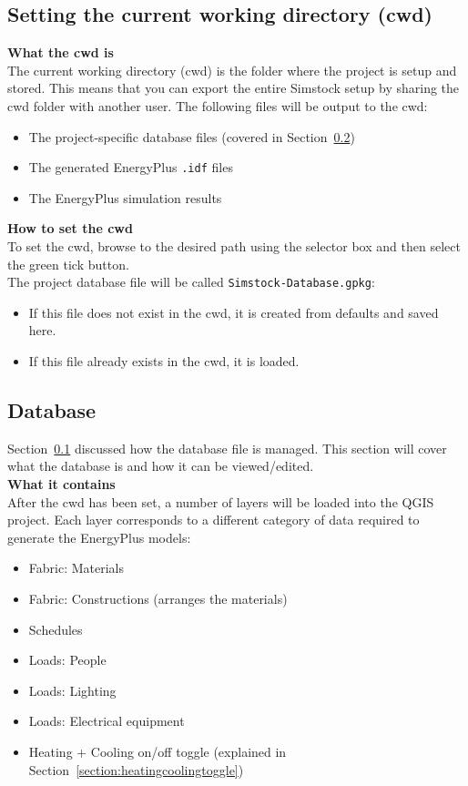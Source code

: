 \documentclass{article}
\begin{document}
\subsection{Setting the current working directory (cwd)}
\label{section:cwd}
\textbf{What the cwd is} \\
The current working directory (cwd) is the folder where the project is setup and stored. This means that you can export the entire Simstock setup by sharing the cwd folder with another user. The following files will be output to the cwd:
\begin{itemize}
    \item The project-specific database files (covered in Section~\ref{section:database})
    \item The generated EnergyPlus \texttt{.idf} files
    \item The EnergyPlus simulation results
\end{itemize}
\textbf{How to set the cwd} \\
To set the cwd, browse to the desired path using the selector box and then select the green tick button. \\

The project database file will be called \texttt{Simstock-Database.gpkg}:
\begin{itemize}
    \item If this file does not exist in the cwd, it is created from defaults and saved here.
    \item If this file already exists in the cwd, it is loaded.
\end{itemize}

\subsection{Database}
\label{section:database}
Section~\ref{section:cwd} discussed how the database file is managed. This section will cover what the database is and how it can be viewed/edited. \\

\textbf{What it contains} \\
After the cwd has been set, a number of layers will be loaded into the QGIS project. Each layer corresponds to a different category of data required to generate the EnergyPlus models:
\begin{itemize}
    \item Fabric: Materials %
    \item Fabric: Constructions (arranges the materials)
    \item Schedules
    \item Loads: People
    \item Loads: Lighting
    \item Loads: Electrical equipment
    \item Heating + Cooling on/off toggle (explained in Section~\ref{section:heatingcoolingtoggle})
\end{itemize}
\end{document}
